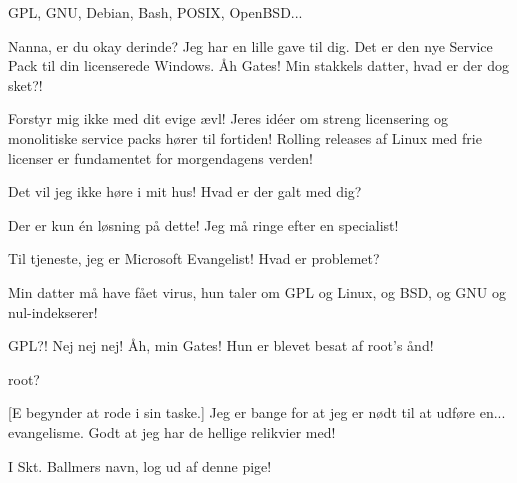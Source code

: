 \documentclass[a4paper,11pt]{article}
\begin{document}
\begin{sketch}

   GPL, GNU, Debian, Bash, POSIX, OpenBSD...

  Nanna, er du okay derinde?  Jeg har en lille
gave til dig.   Det er den
nye Service Pack til din licenserede Windows.   Åh Gates!  Min stakkels datter, hvad er der dog sket?!


  Forstyr mig ikke med dit evige ævl!  Jeres
idéer om streng licensering og monolitiske service packs hører til
fortiden!  Rolling releases af Linux med frie licenser er fundamentet
for morgendagens verden!


 Det vil jeg ikke høre i mit hus!  Hvad er der galt med dig?


 Der er kun én løsning på dette!  Jeg må ringe efter en
specialist!


 Til tjeneste, jeg er Microsoft Evangelist!  Hvad er
problemet?

 Min datter må have fået virus, hun taler om GPL og Linux, og
BSD, og GNU og nul-indekserer!

  GPL?!  Nej nej nej!  Åh, min Gates!
  Hun er blevet besat af root's ånd!

 root?

[E begynder at rode i sin taske.]  Jeg er bange for at jeg er
nødt til at udføre en... evangelisme.  Godt at jeg har de hellige
relikvier med!


 I Skt. Ballmers navn, log ud af denne pige!


\end{sketch}
\end{document}
